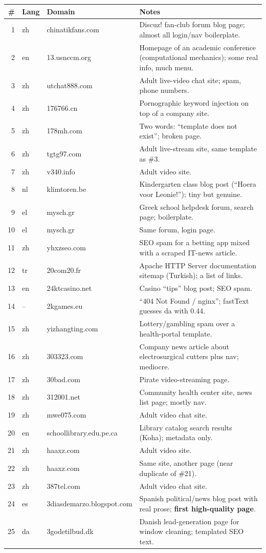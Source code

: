 \documentclass[11pt]{article}
\begin{document}
\begin{small}
\begin{tabularx}{\linewidth}{@{}rllX@{}}
\toprule
\# & Lang & Domain & Notes \\
\midrule
1 & zh & chinatikfans.com & Discuz! fan-club forum blog page; almost all login/nav boilerplate. \\
2 & en & 13.usnccm.org & Homepage of an academic conference (computational mechanics); some real info, much menu. \\
3 & zh & utchat888.com & Adult live-video chat site; spam, phone numbers. \\
4 & zh & 176766.cn & Pornographic keyword injection on top of a company site. \\
5 & zh & 178mh.com & Two words: ``template does not exist''; broken page. \\
6 & zh & tgtg97.com & Adult live-stream site, same template as \#3. \\
7 & zh & v340.info & Adult video site. \\
8 & nl & klimtoren.be & Kindergarten class blog post (``Hoera voor Leonie!''); tiny but genuine. \\
9 & el & mysch.gr & Greek school helpdesk forum, search page; boilerplate. \\
10 & el & mysch.gr & Same forum, login page. \\
11 & zh & yhxzseo.com & SEO spam for a betting app mixed with a scraped IT-news article. \\
12 & tr & 20com20.fr & Apache HTTP Server documentation sitemap (Turkish); a list of links. \\
13 & en & 24ktcasino.net & Casino ``tips'' blog post; SEO spam. \\
14 & -- & 2kgames.eu & ``404 Not Found / nginx''; fastText guesses da with 0.44. \\
15 & zh & yizhangting.com & Lottery/gambling spam over a health-portal template. \\
16 & zh & 303323.com & Company news article about electrosurgical cutters plus nav; mediocre. \\
17 & zh & 30bad.com & Pirate video-streaming page. \\
18 & zh & 312001.net & Community health center site, news list page; mostly nav. \\
19 & zh & mwe075.com & Adult video chat site. \\
20 & en & schoollibrary.edu.pe.ca & Library catalog search results (Koha); metadata only. \\
21 & zh & haaxz.com & Adult video site. \\
22 & zh & haaxz.com & Same site, another page (near duplicate of \#21). \\
23 & zh & 387tel.com & Adult video chat site. \\
24 & es & 3diasdemarzo.blogspot.com & Spanish political/news blog post with real prose; \textbf{first high-quality page}. \\
25 & da & 3godetilbud.dk & Danish lead-generation page for window cleaning; templated SEO text. \\
\bottomrule
\end{tabularx}
\end{small}
\end{document}
